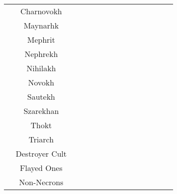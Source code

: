 \begin{tabular}{||c c c c c c c c c c c c c c c||}
	& Charnovokh & & \greyskull & \blackskull & \blackskull & \blackskull & \blackskull & \blackskull & \redskull & \blackskull & \blackskull & \greyskull & \redskull & \redskull \\
	& Maynarhk & \greyskull & & \greyskull & \greyskull & \redskull & \blackskull & \greyskull & \blackskull & \greyskull & \blackskull & \blackskull & \blackskull & \redskull \\
	& Mephrit & \blackskull & \greyskull & & \greyskull & \greyskull  & \blackskull & \blackskull & \yellowskull & \blackskull & \blackskull & \greyskull & \redskull & \redskull \\
	& Nephrekh & \blackskull & \greyskull & \greyskull & & \blackskull & \blackskull & \blackskull & \blackskull & \blackskull & \blackskull & \greyskull & \redskull & \redskull \\
	& Nihilakh & \blackskull & \redskull & \greyskull & \blackskull & & \greyskull & \blackskull & \yellowskull & \blackskull & \blackskull & \greyskull & \redskull & \redskull \\
	& Novokh & \blackskull & \blackskull & \blackskull & \blackskull & \greyskull & & \blackskull & \blackskull & \blackskull & \yellowskull & \yellowskull & \redskull & \redskull \\
	& Sautekh & \blackskull & \greyskull & \blackskull & \blackskull & \blackskull & \blackskull & & \redskull & \greyskull & \greyskull & \greyskull & \redskull & \redskull \\
	& Szarekhan & \redskull & \blackskull & \yellowskull & \blackskull & \yellowskull & \blackskull & \redskull & & \yellowskull & \yellowskull & \greyskull & \redskull & \redskull \\
	& Thokt & \blackskull & \greyskull & \blackskull & \blackskull & \blackskull & \blackskull & \greyskull & \yellowskull & & \yellowskull & \greyskull & \redskull & \redskull \\
	& Triarch & \blackskull & \blackskull & \blackskull & \blackskull & \yellowskull & \blackskull & \greyskull & \yellowskull & \yellowskull & & \greyskull & \redskull & \redskull \\
	& Destroyer Cult & \greyskull & \blackskull & \greyskull & \greyskull & \greyskull & \yellowskull & \greyskull & \greyskull & \greyskull & \greyskull & & \greyskull & \redskull \\
	& Flayed Ones & \redskull & \blackskull & \redskull & \redskull & \redskull & \redskull & \redskull & \redskull & \redskull & \redskull & \greyskull & & \redskull \\
	& Non-Necrons & \redskull & \redskull & \redskull & \redskull & \redskull & \redskull & \redskull & \redskull & \redskull & \redskull & \redskull & \redskull & \\
	\hline
\end{tabular}


